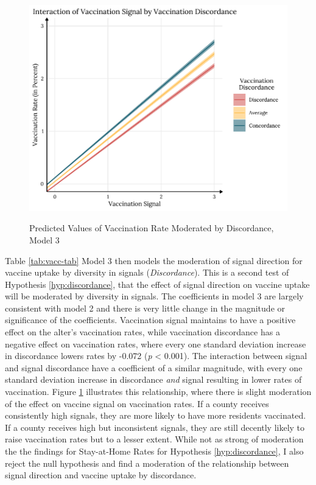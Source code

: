 \begin{figure}
{\centering \includegraphics[width=0.8\linewidth]{figs/paper3/plot-vacc-h3-1}}
\caption{Predicted Values of Vaccination Rate Moderated by Discordance, Model 3}\label{fig:plot-vacc-h3}
\end{figure}

Table \ref{tab:vacc-tab} Model 3 then models the moderation of signal direction
for vaccine uptake by diversity in signals (\emph{Discordance}). This is a
second test of Hypothesis \ref{hyp:discordance}, that the effect of signal
direction on vaccine uptake will be moderated by diversity in signals. The
coefficients in model 3 are largely consistent with model 2 and there is very
little change in the magnitude or significance of the coefficients. Vaccination
signal maintains to have a positive effect on the alter's vaccination rates,
while vaccination discordance has a negative effect on vaccination rates, where
every one standard deviation increase in discordance lowers rates by -0.072
(\emph{p} \textless{} 0.001). The interaction between signal and signal
discordance have a coefficient of a similar magnitude, with every one standard
deviation increase in discordance \emph{and} signal resulting in lower rates of
vaccination. Figure \ref{fig:plot-vacc-h3} illustrates this relationship, where
there is slight moderation of the effect on vaccine signal on vaccination rates.
If a county receives consistently high signals, they are more likely to have
more residents vaccinated. If a county receives high but inconsistent signals,
they are still decently likely to raise vaccination rates but to a lesser
extent. While not as strong of moderation the the findings for Stay-at-Home
Rates for Hypothesis \ref{hyp:discordance}, I also reject the null hypothesis
and find a moderation of the relationship between signal direction and vaccine
uptake by discordance.

